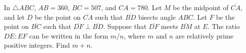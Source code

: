 In $\triangle ABC$, $AB = 360$, $BC = 507$, and $CA = 780$.  Let $M$ be the midpoint of $\overline{CA}$, and let $D$ be the point on $\overline{CA}$ such that $\overline{BD}$ bisects angle $ABC$.  Let $F$ be the point on $\overline{BC}$ such that $\overline{DF} \perp \overline{BD}$.  Suppose that $\overline{DF}$ meets $\overline{BM}$ at $E$.  The ratio $DE: EF$ can be written in the form $m/n$, where $m$ and $n$ are relatively prime positive integers.  Find $m + n$.
